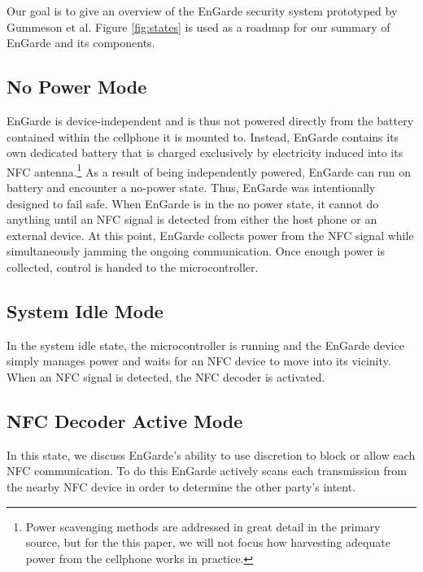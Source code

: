 \documentclass{sig-alternate}
\begin{document}
Our goal is to give an overview of the EnGarde security system prototyped by Gummeson et al. Figure \ref{fig:states} is used as a roadmap for our summary of EnGarde and its components.

\subsection{No Power Mode}

EnGarde is device-independent and is thus not powered directly from the battery contained within the cellphone it is mounted to. Instead, EnGarde contains its own dedicated battery that is charged exclusively by electricity induced into its NFC antenna.\footnote{Power scavenging methods are addressed in great detail in the primary source, but for the this paper, we will not focus how harvesting adequate power from the cellphone works in practice.}
As a result of being independently powered, EnGarde can run on battery and encounter a no-power state. Thus, EnGarde was intentionally designed to fail safe. When EnGarde is in the no power state, it cannot do anything until an NFC signal is detected from either the host phone or an external device. At this point, EnGarde collects power from the NFC signal while simultaneously jamming the ongoing communication. Once enough power is collected, control is handed to the microcontroller.

\subsection{System Idle Mode}
In the system idle state, the microcontroller is running and the EnGarde device simply manages power and waits for an NFC device to move into its vicinity. When an NFC signal is detected, the NFC decoder is activated.

\subsection{NFC Decoder Active Mode}
In this state, we discuss EnGarde's ability to use discretion to block or allow each NFC communication. To do this EnGarde actively scans each transmission from the nearby NFC device in order to determine the other party's intent.
\end{document}
